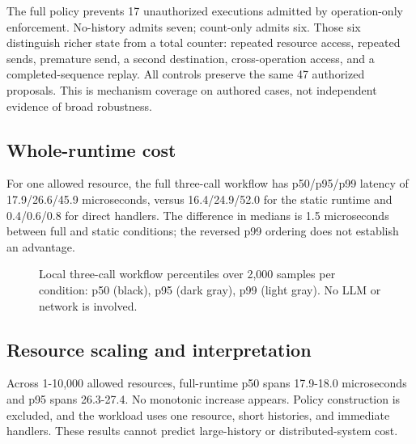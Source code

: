 \documentclass[conference,letterpaper]{IEEEtran}
\begin{document}
The full policy prevents 17 unauthorized executions admitted by operation-only enforcement. No-history admits seven; count-only admits six. Those six distinguish richer state from a total counter: repeated resource access, repeated sends, premature send, a second destination, cross-operation access, and a completed-sequence replay. All controls preserve the same 47 authorized proposals. This is mechanism coverage on authored cases, not independent evidence of broad robustness.


\subsection{Whole-runtime cost}

For one allowed resource, the full three-call workflow has p50/p95/p99 latency of 17.9/26.6/45.9 microseconds, versus 16.4/24.9/52.0 for the static runtime and 0.4/0.6/0.8 for direct handlers. The difference in medians is 1.5 microseconds between full and static conditions; the reversed p99 ordering does not establish an advantage.


\begin{figure}[ht]
\centering
{}
\caption{Local three-call workflow percentiles over 2,000 samples per condition: p50 (black), p95 (dark gray), p99 (light gray). No LLM or network is involved.}
\end{figure}


\subsection{Resource scaling and interpretation}

Across 1-10,000 allowed resources, full-runtime p50 spans 17.9-18.0 microseconds and p95 spans 26.3-27.4. No monotonic increase appears. Policy construction is excluded, and the workload uses one resource, short histories, and immediate handlers. These results cannot predict large-history or distributed-system cost.
\end{document}
